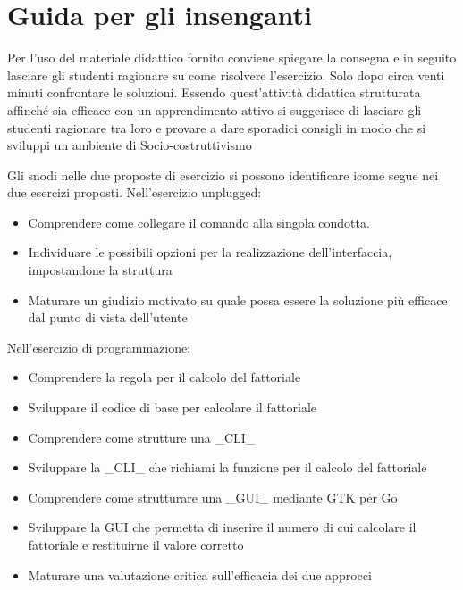 \section{Guida per gli insenganti}
Per l'uso del materiale didattico fornito conviene spiegare la consegna e in seguito lasciare gli studenti ragionare su come risolvere l'esercizio. Solo dopo circa venti  minuti confrontare le soluzioni. Essendo quest'attività didattica strutturata affinché sia efficace con un apprendimento attivo si suggerisce di lasciare gli studenti ragionare tra loro e provare a dare sporadici consigli in modo che si sviluppi un ambiente di Socio-costruttivismo

Gli snodi nelle due proposte di esercizio si possono identificare icome segue nei due esercizi proposti. 
Nell'esercizio unplugged:
\begin{itemize}
\item Comprendere come collegare il comando alla singola condotta.
\item Individuare le possibili opzioni per la realizzazione dell'interfaccia, impostandone la struttura
\item Maturare un giudizio motivato su quale possa essere la soluzione più efficace dal punto di vista dell'utente
\end{itemize}

Nell'esercizio di programmazione:
\begin{itemize}
\item Comprendere la regola per il calcolo del fattoriale
\item Sviluppare il codice di base per calcolare il fattoriale
\item Comprendere come strutture una _CLI_ 
\item Sviluppare la _CLI_ che richiami la funzione per il calcolo del fattoriale
\item Comprendere come strutturare una _GUI_ mediante GTK per Go
\item Sviluppare la GUI che permetta di inserire il numero di cui calcolare il fattoriale e restituirne il valore corretto
\item Maturare una valutazione critica sull'efficacia dei due approcci
\end{itemize}